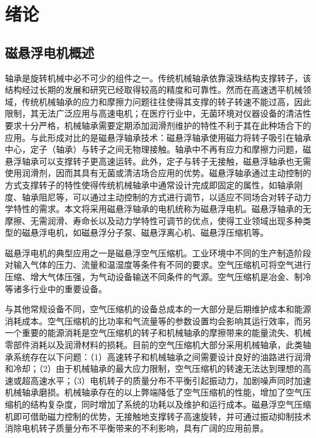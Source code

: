 \documentclass[
  lang=cn,
  degree=master,
  openany,oneside
]{nuaathesis}
\begin{document}
\makecover
\makedeclare
\frontmatter
\makeabstract
\nuaatableofcontents
\nuaalistoffigurestables


\mainmatter

\chapter{绪论}
\section{磁悬浮电机概述}
轴承是旋转机械中必不可少的组件之一\cite{Xie.1995}。传统机械轴承依靠滚珠结构支撑转子，该结构经过长期的发展和研究已经取得较高的精度和可靠性。然而在高速透平机械领域，传统机械轴承的应力和摩擦力问题往往使得其支撑的转子转速不能过高，因此限制，其无法广泛应用与高速电机；在医疗行业中，无菌环境对仪器设备的清洁性要求十分严格，机械轴承需要定期添加润滑剂维护的特性不利于其在此种场合下的应用。与此形成对比的是磁悬浮轴承技术：磁悬浮轴承使用磁力将转子吸引在轴承中心，定子（轴承）与转子之间无物理接触。轴承中不再有应力和摩擦力问题，磁悬浮轴承可以支撑转子更高速运转。此外，定子与转子无接触，磁悬浮轴承也无需使用润滑剂，因而其具有无菌或清洁场合应用的优势。磁悬浮轴承通过主动控制的方式支撑转子的特性使得传统机械轴承中通常设计完成即固定的属性，如轴承刚度、轴承阻尼等，可以通过主动控制的方式进行调节，以适应不同场合对转子动力学特性的需求。本文将采用磁悬浮轴承的电机统称为磁悬浮电机。磁悬浮轴承的无摩擦、无需润滑、寿命长以及动力学特性可调节的优点，使得工业领域出现多种类型的磁悬浮电机，如磁悬浮分子泵、磁悬浮离心机、磁悬浮压缩机等。

磁悬浮电机的典型应用之一是磁悬浮空气压缩机。工业环境中不同的生产制造阶段对输入气体的压力、流量和温湿度等条件有不同的要求。空气压缩机可将空气进行压缩、增大气体压强，为气动设备输送不同条件的气源。空气压缩机是冶金、制冷等诸多行业中的重要设备。

与其他常规设备不同，空气压缩机的设备总成本的一大部分是后期维护成本和能源消耗成本。空气压缩机的比功率和气流量等的参数设置均会影响其运行效率，而另一个重要的能源消耗是空气压缩机的转子和机械轴承的摩擦带来的能量流失、机械零部件消耗以及润滑材料的损耗。目前的空气压缩机大部分采用机械轴承，此类轴承系统存在以下问题：（1）高速转子和机械轴承之间需要设计良好的油路进行润滑和冷却；（2）由于机械轴承的最大应力限制，空气压缩机的转速无法达到理想的高速或超高速水平；（3）电机转子的质量分布不平衡引起振动力，加剧噪声同时加速机械轴承磨损。机械轴承存在的以上弊端降低了空气压缩机的性能，增加了空气压缩机的结构复杂度，同时增加了系统的功耗以及维护和运行成本。磁悬浮空气压缩机即可借助磁力控制的优势，无接触地支撑转子高速旋转，并可通过振动抑制技术消除电机转子质量分布不平衡带来的不利影响，具有广阔的应用前景。
\end{document}
